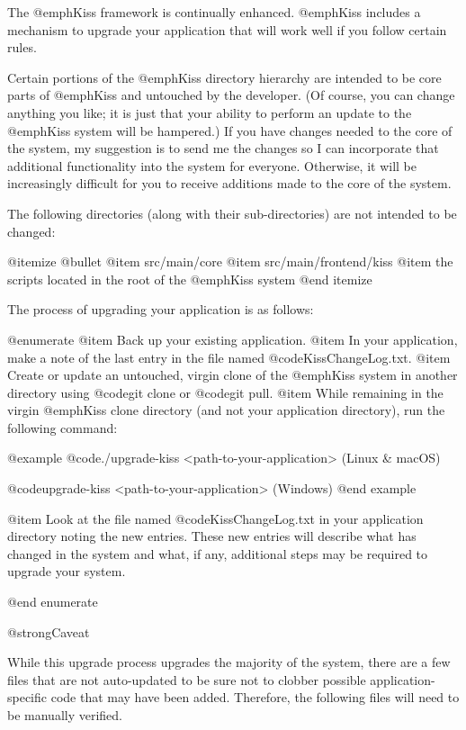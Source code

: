 The @emph{Kiss} framework is continually enhanced.  
@emph{Kiss} includes a mechanism to upgrade your application that will work well if you follow certain rules.

Certain portions of the @emph{Kiss} directory hierarchy are intended to be core parts of @emph{Kiss} and untouched by the developer.
(Of course, you can change anything you like; it is just that your ability to perform an update to the @emph{Kiss} system will be hampered.)
If you have changes needed to the core of the system, my suggestion is to send me the changes so I can incorporate that additional functionality into the system for everyone.
Otherwise, it will be increasingly difficult for you to receive additions made to the core of the system.

The following directories (along with their sub-directories) are not intended to be changed:

@itemize @bullet
@item
src/main/core
@item
src/main/frontend/kiss
@item
the scripts located in the root of the @emph{Kiss} system
@end itemize

The process of upgrading your application is as follows:

@enumerate
@item
Back up your existing application.
@item
In your application, make a note of the last entry in the file named @code{KissChangeLog.txt}.
@item
Create or update an untouched, virgin clone of the @emph{Kiss} system in another directory using 
@code{git clone} or @code{git pull}.
@item
While remaining in the virgin @emph{Kiss} clone directory (and not your application directory),
run the following command:  

@example
@code{./upgrade-kiss <path-to-your-application>}     (Linux & macOS)

@code{upgrade-kiss <path-to-your-application>}       (Windows)
@end example

@item
Look at the file named @code{KissChangeLog.txt} in your application
directory noting the new entries.  These new entries will describe
what has changed in the system and what, if any, additional steps may
be required to upgrade your system.

@end enumerate

@strong{Caveat}

While this upgrade process upgrades the majority of the system, there
are a few files that are not auto-updated to be sure not to clobber
possible application-specific code that may have been added.
Therefore, the following files will need to be manually verified.

